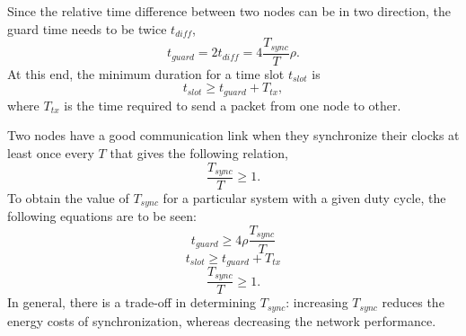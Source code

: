 \documentclass[journal]{IEEEtran}
\begin{document}
Since the relative time difference between two nodes can be in two direction, the guard time needs to be twice $t_{diff}$,
\begin{equation}
t_{guard}= 2t_{diff} = 4\frac{T_{sync}}{T}\rho.
\end{equation}
At this end, the minimum duration for a time slot $t_{slot}$ is
\begin{equation}
t_{slot} \geq t_{guard} + T_{tx},
\end{equation}
where $T_{tx}$ is the time required to send a packet from one node to other.
\par Two nodes have a good communication link when they synchronize
their clocks at least once every $T$ that gives the following
relation,
\begin{equation}
\frac{T_{sync}}{T}\geq 1.
\end{equation}
To obtain the value of $T_{sync}$ for a particular system with a given duty cycle, the following equations are to be seen:
\begin{equation}
t_{guard} \geq 4\rho \frac{T_{sync}}{T}
\end{equation}
\begin{equation}
t_{slot} \geq t_{guard} + T_{tx}
\end{equation}
\begin{equation}
\frac{T_{sync}}{T} \geq 1.
\end{equation}
In general, there is a trade-off in determining $T_{sync}$: increasing $T_{sync}$ reduces the energy costs of synchronization, whereas decreasing the network performance.
\end{document}
